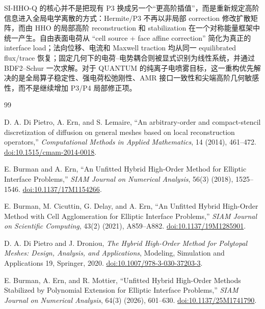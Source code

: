 \documentclass[UTF8,a4paper,11pt]{ctexart}
\begin{document}
SI-HHO-Q 的核心并不是把现有 P3 换成另一个“更高阶插值”，而是重新规定高阶信息进入全局电学离散的方式：Hermite/P3 不再以非局部 correction 修改扩散矩阵，而由 HHO 的局部高阶 reconstruction 和 stabilization 在一个对称能量框架中统一产生。自由表面电荷从 ``cell source + face affine correction'' 简化为真正的 interface load；法向位移、电流和 Maxwell traction 均从同一 equilibrated flux/trace 恢复；固定几何下的电荷--电势耦合则被显式识别为线性系统，并通过 BDF2--Schur 一次求解。对于 QUANTUM 的纯离子电喷雾目标，这一重构优先解决的是全局算子稳定性、强电荷松弛刚性、AMR 接口一致性和尖端高阶几何敏感性，而不是继续增加 P3/P4 局部修正项。

\begin{thebibliography}{99}

D. A. Di Pietro, A. Ern, and S. Lemaire,
``An arbitrary-order and compact-stencil discretization of diffusion on general meshes based on local reconstruction operators,''
\emph{Computational Methods in Applied Mathematics}, 14 (2014), 461--472.
\href{https://doi.org/10.1515/cmam-2014-0018}{doi:10.1515/cmam-2014-0018}.

E. Burman and A. Ern,
``An Unfitted Hybrid High-Order Method for Elliptic Interface Problems,''
\emph{SIAM Journal on Numerical Analysis}, 56(3) (2018), 1525--1546.
\href{https://doi.org/10.1137/17M1154266}{doi:10.1137/17M1154266}.

E. Burman, M. Cicuttin, G. Delay, and A. Ern,
``An Unfitted Hybrid High-Order Method with Cell Agglomeration for Elliptic Interface Problems,''
\emph{SIAM Journal on Scientific Computing}, 43(2) (2021), A859--A882.
\href{https://doi.org/10.1137/19M1285901}{doi:10.1137/19M1285901}.

D. A. Di Pietro and J. Droniou,
\emph{The Hybrid High-Order Method for Polytopal Meshes: Design, Analysis, and Applications},
Modeling, Simulation and Applications 19, Springer, 2020.
\href{https://doi.org/10.1007/978-3-030-37203-3}{doi:10.1007/978-3-030-37203-3}.

E. Burman, A. Ern, and R. Mottier,
``Unfitted Hybrid High-Order Methods Stabilized by Polynomial Extension for Elliptic Interface Problems,''
\emph{SIAM Journal on Numerical Analysis}, 64(3) (2026), 601--630.
\href{https://doi.org/10.1137/25M1741790}{doi:10.1137/25M1741790}.

\end{thebibliography}
\end{document}
